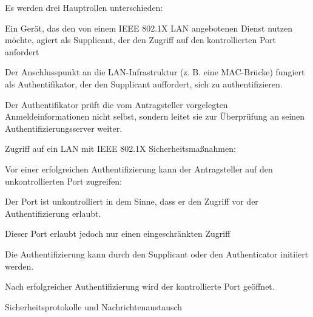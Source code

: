 \documentclass[a4paper]{article}
\begin{document}
\begin{multicols}{3}
      \begin{itemize*}
            \item Es werden drei Hauptrollen unterschieden:
            \begin{itemize*}
                  \item Ein Gerät, das den von einem IEEE 802.1X LAN angebotenen Dienst nutzen möchte, agiert als Supplicant, der den Zugriff auf den kontrollierten Port anfordert
                  \item Der Anschlusspunkt an die LAN-Infrastruktur (z. B. eine MAC-Brücke) fungiert als Authentifikator, der den Supplicant auffordert, sich zu authentifizieren.
                  \item Der Authentifikator prüft die vom Antragsteller vorgelegten Anmeldeinformationen nicht selbst, sondern leitet sie zur Überprüfung an seinen Authentifizierungsserver weiter.
            \end{itemize*}
            \item Zugriff auf ein LAN mit IEEE 802.1X Sicherheitsmaßnahmen:
            \begin{itemize*}
                  \item Vor einer erfolgreichen Authentifizierung kann der Antragsteller auf den unkontrollierten Port zugreifen:
                  \begin{itemize*} \item Der Port ist unkontrolliert in dem Sinne, dass er den Zugriff vor der Authentifizierung erlaubt. \item Dieser Port erlaubt jedoch nur einen eingeschränkten Zugriff \end{itemize*}
                  \item Die Authentifizierung kann durch den Supplicant oder den Authenticator initiiert werden.
                  \item Nach erfolgreicher Authentifizierung wird der kontrollierte Port geöffnet.
            \end{itemize*}
      \end{itemize*}

      Sicherheitsprotokolle und Nachrichtenaustausch


\end{multicols}
\end{document}
